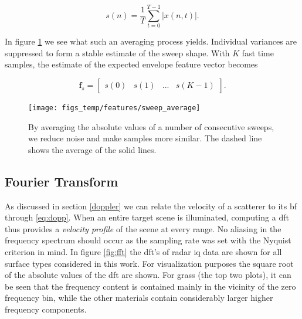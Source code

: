 \begin{equation}
	s(n) = \frac{1}{T}\sum_{t=0}^{T-1}|x(n, t)|.
\end{equation}

In figure \ref{fig:sweep_average} we see what such an averaging process yields. Individual variances are suppressed to form a stable estimate of the sweep shape. With $K$ fast time samples, the estimate of the expected envelope feature vector becomes 

\begin{equation}
	\mathbf{f}_{s} = 
	\begin{bmatrix}
		s(0) & s(1) & ... & s(K-1)
	\end{bmatrix}.
\end{equation}


\begin{figure}[h]
	\centering
	\texttt{[image: figs\_temp/features/sweep\_average]}
	\caption{By averaging the absolute values of a number of consecutive sweeps, we reduce noise and make samples more similar. The dashed line shows the average of the solid lines. }
	\label{fig:sweep_average}
\end{figure}


\subsection{Fourier Transform}

As discussed in section \ref{doppler} we can relate the velocity of a scatterer to its \gls{bf} through \eqref{eq:dopp}. When an entire target scene is illuminated, computing a \gls{dft} thus provides a \emph{velocity profile} of the scene at every range. No aliasing in the frequency spectrum should occur as the sampling rate was set with the Nyquist criterion in mind. In figure \ref{fig:fft} the \gls{dft}'s of radar \gls{iq} data are shown for all surface types considered in this work. For visualization purposes the square root of the absolute values of the \gls{dft} are shown. For grass (the top two plots), it can be seen that the frequency content is contained mainly in the vicinity of the zero frequency bin, while the other materials contain considerably larger higher frequency components. %


